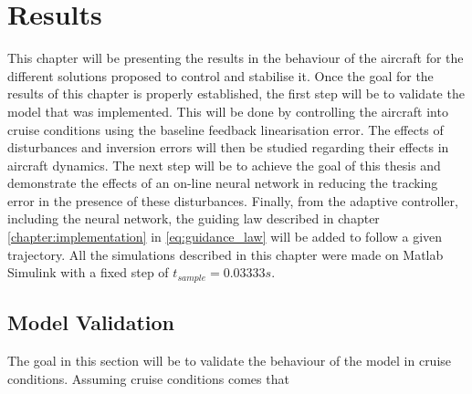 
\chapter{Results}
\label{chapter:results}

This chapter will be presenting the results in the behaviour of the aircraft for the different solutions proposed to control and stabilise it. Once the goal for the results of this chapter is properly established, the first step will be to validate the model that was implemented. This will be done by controlling the aircraft into cruise conditions using the baseline feedback linearisation error. The effects of disturbances and inversion errors will then be studied regarding their effects in aircraft dynamics. The next step will be to achieve the goal of this thesis and demonstrate the effects of an on-line neural network in reducing the tracking error in the presence of these disturbances. Finally, from the adaptive controller, including the neural network, the guiding law described in chapter \ref{chapter:implementation} in \ref{eq:guidance_law} will be added to follow a given trajectory. 
All the simulations described in this chapter were made on Matlab Simulink with a fixed step of $t_{sample} = 0.03333 s$.


\section{Model Validation}
\label{section:results/validation}

The goal in this section will be to validate the behaviour of the model in cruise conditions. Assuming cruise conditions comes that

